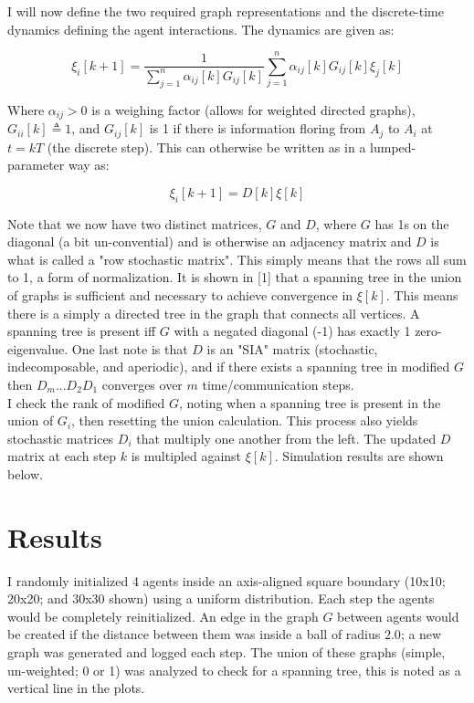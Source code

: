 \documentclass[12pt]{article}
\begin{document}
I will now define the two required graph representations and the discrete-time dynamics defining the agent interactions. The dynamics are given as:

\begin{equation}
	\xi_{i}[k+1] = \frac{1}{\sum_{j=1}^{n} \alpha_{ij}[k]G_{ij}[k]} \sum_{j=1}^{n} \alpha_{ij}[k]G_{ij}[k]\xi_{j}[k]
\end{equation}

Where $\alpha_{ij} > 0$ is a weighing factor (allows for weighted directed graphs), $G_{ii}[k] \triangleq 1$, and $G_{ij}[k]$ is 1 if there is information floring from $A_{j}$ to $A_{i}$ at $t= kT$ (the discrete step). This can otherwise be written as in a lumped-parameter way as:

\begin{equation}
	\xi_{i}[k+1] = D[k]\xi[k]
\end{equation}

Note that we now have two distinct matrices, $G$ and $D$, where $G$ has 1s on the diagonal (a bit un-convential) and is otherwise an adjacency matrix and $D$ is what is called a "row stochastic matrix". This simply means that the rows all sum to 1, a form of normalization. It is shown in [1] that a spanning tree in the union of graphs is sufficient and necessary to achieve convergence in $\xi[k]$. This means there is a simply a directed tree in the graph that connects all vertices. A spanning tree is present iff $G$ with a negated diagonal (-1) has exactly 1 zero-eigenvalue. One last note is that $D$ is an "SIA" matrix (stochastic, indecomposable, and aperiodic), and if there exists a spanning tree in modified $G$ then $D_{m} ... D_{2}D_{1}$ converges over $m$ time/communication steps. \\

I check the rank of modified $G$, noting when a spanning tree is present in the union of $G_{i}$, then resetting the union calculation. This process also yields stochastic matrices $D_{i}$ that multiply one another from the left. The updated $D$ matrix at each step $k$ is multipled against $\xi[k]$. Simulation results are shown below.

\section{Results}\label{results}

I randomly initialized 4 agents inside an axis-aligned square boundary (10x10; 20x20; and 30x30 shown) using a uniform distribution. Each step the agents would be completely reinitialized. An edge in the graph $G$ between agents would be created if the distance between them was inside a ball of radius $2.0$; a new graph was generated and logged each step. The union of these graphs (simple, un-weighted; 0 or 1) was analyzed to check for a spanning tree, this is noted as a vertical line in the plots. \\
\end{document}
